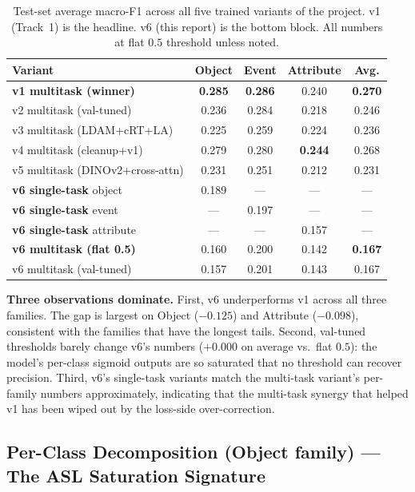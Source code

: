 \documentclass[journal]{IEEEtran}
\begin{document}
\begin{table}[!t]
  \caption{Test-set average macro-F1 across all five trained variants of the project. v1 (Track~1) is the headline. v6 (this report) is the bottom block. All numbers at flat $0.5$ threshold unless noted.}
  \label{tab:main}
  \centering
  \small
  \begin{tabular}{@{}lcccc@{}}
  \toprule
  Variant & Object & Event & Attribute & \textbf{Avg.} \\
  \midrule
  \textbf{v1 multitask (winner)}     & \textbf{0.285} & \textbf{0.286} & 0.240 & \textbf{0.270} \\
  v2 multitask (val-tuned)           & 0.236 & 0.284 & 0.218 & 0.246 \\
  v3 multitask (LDAM+cRT+LA)         & 0.225 & 0.259 & 0.224 & 0.236 \\
  v4 multitask (cleanup+v1)          & 0.279 & 0.280 & \textbf{0.244} & 0.268 \\
  v5 multitask (DINOv2+cross-attn)   & 0.231 & 0.251 & 0.212 & 0.231 \\
  \midrule
  \textbf{v6 single-task} object     & 0.189 & --- & --- & --- \\
  \textbf{v6 single-task} event      & --- & 0.197 & --- & --- \\
  \textbf{v6 single-task} attribute  & --- & --- & 0.157 & --- \\
  \textbf{v6 multitask (flat 0.5)}   & 0.160 & 0.200 & 0.142 & \textbf{0.167} \\
  v6 multitask (val-tuned)           & 0.157 & 0.201 & 0.143 & 0.167 \\
  \bottomrule
  \end{tabular}
\end{table}

\textbf{Three observations dominate.} First, v6 underperforms v1 across all three families. The gap is largest on Object ($-0.125$) and Attribute ($-0.098$), consistent with the families that have the longest tails. Second, val-tuned thresholds barely change v6's numbers ($+0.000$ on average vs.\ flat $0.5$): the model's per-class sigmoid outputs are so saturated that no threshold can recover precision. Third, v6's single-task variants match the multi-task variant's per-family numbers approximately, indicating that the multi-task synergy that helped v1 has been wiped out by the loss-side over-correction.

\subsection{Per-Class Decomposition (Object family) — The ASL Saturation Signature}\label{ssec:perclass}
\end{document}
